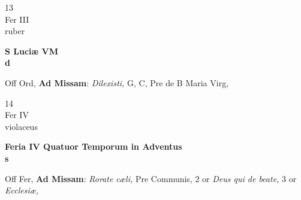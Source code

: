 \documentclass[10pt, openany]{book}
\begin{document}
        \begin{center}
            \begin{minipage}{3.5in}
                \vspace{2em}
                \begin{minipage}{0.5in}
                    {\Huge 13} \\
                    {\normalsize Fer III} \\
                    {\normalsize ruber}
                \end{minipage}
                \begin{minipage}{3.0in}
                    \textbf{ \large S Luciæ VM \\
                    \textnormal{\normalsize d}} \\ 
                \end{minipage}
                \begin{justify}Off Ord, \textbf{Ad Missam}: \textit{Dilexisti,} G, C, Pre de B Maria Virg,   
                \end{justify}
            \end{minipage}
        \end{center}
    
        \begin{center}
            \begin{minipage}{3.5in}
                \vspace{2em}
                \begin{minipage}{0.5in}
                    {\Huge 14} \\
                    {\normalsize Fer IV} \\
                    {\normalsize violaceus}
                \end{minipage}
                \begin{minipage}{3.0in}
                    \textbf{ \large Feria IV Quatuor Temporum in Adventus \\
                    \textnormal{\normalsize s}} \\ 
                \end{minipage}
                \begin{justify}Off Fer, \textbf{Ad Missam}: \textit{Rorate cæli,} Pre Communis, 2 or \textit{Deus qui de beate,} 3 or \textit{Ecclesiæ,}   
                \end{justify}
            \end{minipage}
        \end{center}
    
\end{document}
